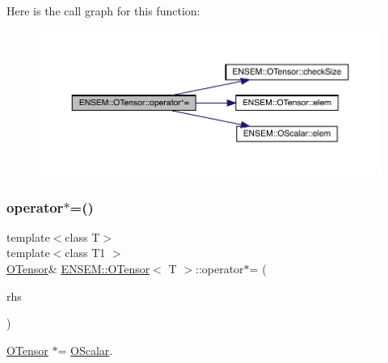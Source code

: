 Here is the call graph for this function\+:
\nopagebreak
\begin{figure}[H]
\begin{center}
\leavevmode
\includegraphics[width=350pt]{da/d8a/classENSEM_1_1OTensor_a0326883980545068700bbdd762df5904_cgraph}
\end{center}
\end{figure}
\mbox{\label{classENSEM_1_1OTensor_a0326883980545068700bbdd762df5904}} 
\subsubsection{\texorpdfstring{operator$\ast$=()}{operator*=()}\hspace{0.1cm}{\footnotesize\ttfamily [2/6]}}
{\footnotesize\ttfamily template$<$class T$>$ \\
template$<$class T1 $>$ \\
\mbox{\hyperlink{classENSEM_1_1OTensor}{O\+Tensor}}\& \mbox{\hyperlink{classENSEM_1_1OTensor}{E\+N\+S\+E\+M\+::\+O\+Tensor}}$<$ T $>$\+::operator$\ast$= (\begin{DoxyParamCaption}\item[{const \mbox{\hyperlink{classENSEM_1_1OScalar}{O\+Scalar}}$<$ T1 $>$ \&}]{rhs }\end{DoxyParamCaption})\hspace{0.3cm}{\ttfamily [inline]}}



\mbox{\hyperlink{classENSEM_1_1OTensor}{O\+Tensor}} $\ast$= \mbox{\hyperlink{classENSEM_1_1OScalar}{O\+Scalar}}. 

